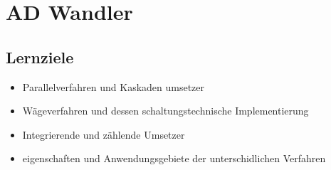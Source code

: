 \section{AD Wandler}
\subsection{Lernziele}
\begin{itemize}
  \item Parallelverfahren und Kaskaden umsetzer
  \item Wägeverfahren und dessen schaltungstechnische Implementierung
  \item Integrierende und zählende Umsetzer
  \item eigenschaften und Anwendungsgebiete der unterschidlichen Verfahren
\end{itemize}

